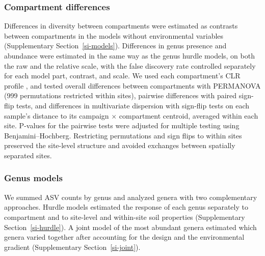 \documentclass[fleqn,10pt,numbers]{olplainarticle}
\begin{document}
\subsubsection*{Compartment differences}
Differences in diversity between compartments were estimated as contrasts between compartments in the models without environmental variables (Supplementary Section~\ref{si-models}). Differences in genus presence and abundance were estimated in the same way as the genus hurdle models, on both the raw and the relative scale, with the false discovery rate controlled separately for each model part, contrast, and scale. We used each compartment's CLR profile , and tested overall differences between compartments with PERMANOVA (999 permutations restricted within sites), pairwise differences with paired sign-flip tests, and differences in multivariate dispersion with sign-flip tests on each sample's distance to its campaign $\times$ compartment centroid, averaged within each site. P-values for the pairwise tests were adjusted for multiple testing using Benjamini--Hochberg. Restricting permutations and sign flips to within sites preserved the site-level structure and avoided exchanges between spatially separated sites.

\subsubsection*{Genus models}
We summed ASV counts by genus and analyzed genera with two complementary approaches. Hurdle models estimated the response of each genus separately to compartment and to site-level and within-site soil properties (Supplementary Section~\ref{si-hurdle}). A joint model of the most abundant genera estimated which genera varied together after accounting for the design and the environmental gradient (Supplementary Section~\ref{si-joint}).
\end{document}
